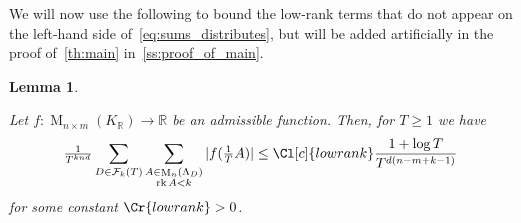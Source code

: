 \documentclass{amsart}
\newtheorem{lemma}[theorem]{Lemma}
\theoremstyle{definition}
\theoremstyle{remark}
\newcommand{\KR}{K_\mathbb{R}}
\DeclareMathOperator{\M}{M}
\DeclareMathOperator{\rank}{rk}
\begin{document}
We will now use the following to bound the low-rank terms that do not appear on the left-hand side of~\cref{eq:sums_distributes}, but will be added artificially in the proof of~\cref{th:main} in~\cref{ss:proof_of_main}.
\begin{lemma}
    \label{le:low_rank_terms}

    Let $f: \M_{n \times m}(\KR) \rightarrow  \mathbb{R}$ be an admissible function. Then, for $T \geq 1$ we have 
    \begin{equation}
        \tfrac{1}{T^{knd}}    \sum_{ D \in \mathcal{F}_{k}(T)} \sum_{\substack{A \in \M_{n}(\Lambda_{D}) \\ \rank A < k}} |f(\tfrac{1}{T} A)|   \leq 
        \Cl[c]{lowrank} \frac{ 1+ \log T}{T^{d(n-m+k-1)}} 
        \label{eq:loewrank}
    \end{equation}
    for some constant $\Cr{lowrank}>0$. 
\end{lemma}
\end{document}
